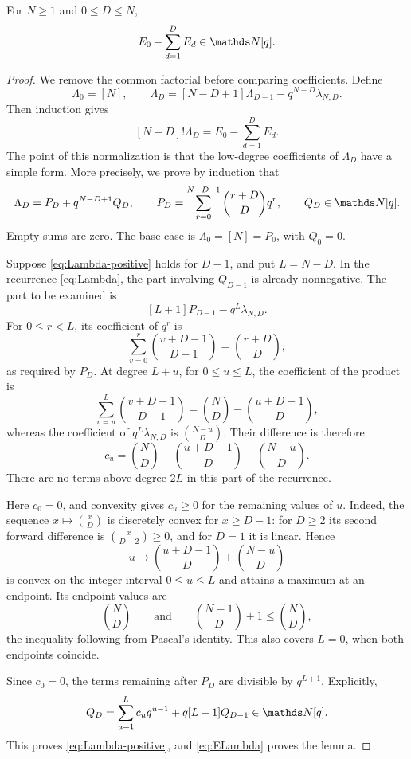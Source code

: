 \documentclass[11pt]{amsart}
\begin{document}
\begin{lemma}\label{lem:domination}
For $N\ge1$ and $0\le D\le N$,
\[
 E_0-\sum_{d=1}^{D}E_d\in\N[q].
\]
\end{lemma}

\begin{proof}
We remove the common factorial before comparing coefficients. Define
\begin{equation}\label{eq:Lambda}
 \Lambda_0=[N],\qquad
 \Lambda_D=[N-D+1]\Lambda_{D-1}-q^{N-D}\lambda_{N,D}.
\end{equation}
Then induction gives
\begin{equation}\label{eq:ELambda}
 [N-D]!\Lambda_D=E_0-\sum_{d=1}^{D}E_d.
\end{equation}
The point of this normalization is that the low-degree coefficients of
$\Lambda_D$ have a simple form. More precisely, we prove by induction that
\begin{equation}\label{eq:Lambda-positive}
 \Lambda_D=P_D+q^{N-D+1}Q_D,\qquad
 P_D=\sum_{r=0}^{N-D-1}\binom{r+D}{D}q^r,\qquad Q_D\in\N[q].
\end{equation}
Empty sums are zero. The base case is $\Lambda_0=[N]=P_0$, with $Q_0=0$.

Suppose \eqref{eq:Lambda-positive} holds for $D-1$, and put $L=N-D$.
In the recurrence \eqref{eq:Lambda}, the part involving $Q_{D-1}$ is
already nonnegative. The part to be examined is
\[
 [L+1]P_{D-1}-q^L\lambda_{N,D}.
\]
For $0\le r<L$, its coefficient of $q^r$ is
\[
 \sum_{v=0}^{r}\binom{v+D-1}{D-1}=\binom{r+D}{D},
\]
as required by $P_D$. At degree $L+u$, for $0\le u\le L$, the
coefficient of the product is
\[
 \sum_{v=u}^{L}\binom{v+D-1}{D-1}
 =\binom ND-\binom{u+D-1}{D},
\]
whereas the coefficient of $q^L\lambda_{N,D}$ is $\binom{N-u}{D}$.
Their difference is therefore
\begin{equation}\label{eq:cu}
 c_u=\binom ND-\binom{u+D-1}{D}-\binom{N-u}{D}.
\end{equation}
There are no terms above degree $2L$ in this part of the recurrence.

Here $c_0=0$, and convexity gives $c_u\ge0$ for the remaining values
of $u$. Indeed, the sequence $x\mapsto\binom{x}{D}$ is discretely
convex for $x\ge D-1$: for $D\ge2$ its second forward difference is
$\binom{x}{D-2}\ge0$, and for $D=1$ it is linear. Hence
\[
 u\longmapsto\binom{u+D-1}{D}+\binom{N-u}{D}
\]
is convex on the integer interval $0\le u\le L$ and attains a maximum
at an endpoint. Its endpoint values are
\[
 \binom ND\qquad\text{and}\qquad
 \binom{N-1}{D}+1\le\binom ND,
\]
the inequality following from Pascal's identity. This also covers
$L=0$, when both endpoints coincide.

Since $c_0=0$, the terms remaining after $P_D$ are divisible by
$q^{L+1}$. Explicitly,
\[
 Q_D=\sum_{u=1}^{L}c_uq^{u-1}+q[L+1]Q_{D-1}\in\N[q].
\]
This proves \eqref{eq:Lambda-positive}, and \eqref{eq:ELambda}
proves the lemma.
\end{proof}
\end{document}
